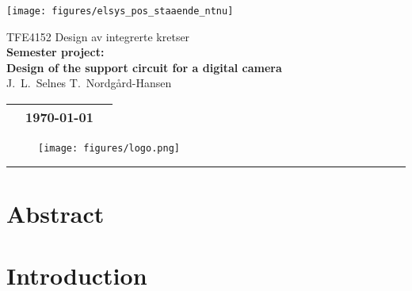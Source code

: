 \documentclass[a4paper, 11pt, english]{article}
\begin{document}
\begin{minipage}[c]{0.10\textwidth}
  \texttt{[image: figures/elsys\_pos\_staaende\_ntnu]}  
\end{minipage}
\begin{minipage}[c]{0.85\textwidth}
  \huge \centering
  TFE4152 Design av integrerte kretser\\
  \vspace{1ex}
  \huge \textbf{
    Semester project:\\
    Design of the support circuit for a digital camera
  }\\
  \vspace{1ex}
  \Large
  J.~L.~Selnes T.~Nordgård-Hansen
  \vspace{3ex}
  
  \normalsize
  
  \begin{tabular}{p{} p{} p{}}
    \toprule
    & \today\\
    \bottomrule
  \end{tabular}
\end{minipage}

\begin{figure}[H]
  \centering
  \texttt{[image: figures/logo.png]}
\end{figure}


\newpage
\setlength{\parskip}{0ex}
\renewcommand{\baselinestretch}{0.1}\normalsize
\onehalfspacing
\tableofcontents
\singlespacing
\renewcommand{\baselinestretch}{1.00}\normalsize
\setlength{\parskip}{2ex}
\rule{\textwidth}{1pt}


% 


\newpage
\section{Abstract} \label{sec:Abstract}


\section{Introduction} \label{sec:Introduction}

\end{document}

